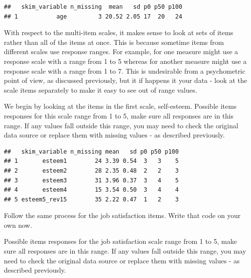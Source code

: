 \documentclass[
]{krantz}
\makeatletter
\newenvironment{Shaded}{\begin{snugshade}}{\end{snugshade}}
\newcommand{\KeywordTok}[1]{\textcolor[rgb]{0.27,0.27,0.27}{\textbf{#1}}}
\newcommand{\NormalTok}[1]{#1}
\newcommand{\OperatorTok}[1]{\textcolor[rgb]{0.43,0.43,0.43}{\textbf{#1}}}
\newcommand{\StringTok}[1]{\textcolor[rgb]{0.5,0.5,0.5}{#1}}
\newenvironment{kframe}{%
\medskip{}
\setlength{\fboxsep}{.8em}
 \def\at@end@of@kframe{}%
 \ifinner\ifhmode%
  \def\at@end@of@kframe{\end{minipage}}%
  \begin{minipage}{\columnwidth}%
 \fi\fi%
 \def\FrameCommand##1{\hskip\@totalleftmargin \hskip-\fboxsep
 \colorbox{shadecolor}{##1}\hskip-\fboxsep
     \hskip-\linewidth \hskip-\@totalleftmargin \hskip\columnwidth}%
 \MakeFramed {\advance\hsize-\width
   \@totalleftmargin\z@ \linewidth\hsize
   \@setminipage}}%
 {\par\unskip\endMakeFramed%
 \at@end@of@kframe}
\renewenvironment{Shaded}{\begin{kframe}}{\end{kframe}}
\makeatother
\begin{document}
\begin{verbatim}
##   skim_variable n_missing  mean   sd p0 p50 p100
## 1           age         3 20.52 2.05 17  20   24
\end{verbatim}

With respect to the multi-item scales, it makes sense to look at sets of items rather than all of the items at once. This is because sometime items from different scales use response ranges. For example, for one measure might use a response scale with a range from 1 to 5 whereas for another measure might use a response scale with a range from 1 to 7. This is undesirable from a psychometric point of view, as discussed previously, but it if happens it your data - look at the scale items separately to make it easy to see out of range values.

We begin by looking at the items in the first scale, self-esteem. Possible items responses for this scale range from 1 to 5, make sure all responses are in this range. If any values fall outside this range, you may need to check the original data source or replace them with missing values - as described previously.

\begin{Shaded}
\end{Shaded}

\begin{verbatim}
##   skim_variable n_missing mean   sd p0 p50 p100
## 1       esteem1        24 3.39 0.54  3   3    5
## 2       esteem2        28 2.35 0.48  2   2    3
## 3       esteem3        31 3.96 0.37  3   4    5
## 4       esteem4        15 3.54 0.50  3   4    4
## 5 esteem5_rev15        35 2.22 0.47  1   2    3
\end{verbatim}

Follow the same process for the job satisfaction items. Write that code on your own now.

Possible items responses for the job satisfaction scale range from 1 to 5, make sure all responses are in this range. If any values fall outside this range, you may need to check the original data source or replace them with missing values - as described previously.
\end{document}
